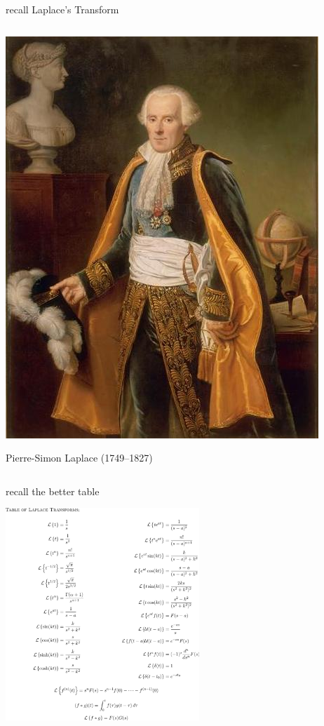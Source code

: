 \documentclass[urlcolor=blue,dvipsnames]{beamer}
\begin{document}
\begin{frame}{recall Laplace's Transform}
\begin{columns}
\begin{column}{0.23\textwidth}
\vspace{3mm}
\includegraphics[width=\textwidth]{figs/Laplace-grand}

\tiny
Pierre-Simon Laplace (1749--1827) 
\end{column}
\end{columns}
\end{frame}


\begin{frame}{recall the better table}

\vspace{-2mm}
\begin{center}
\includegraphics[height=80mm]{figs/fulllaplacetable}
\end{center}
\end{frame}
\end{document}

